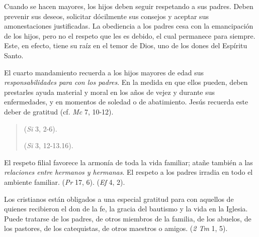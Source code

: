 	Cuando se hacen mayores, los hijos deben seguir respetando a sus padres. Deben prevenir sus deseos, solicitar dócilmente sus consejos y aceptar sus amonestaciones justificadas. La obediencia a los padres cesa con la emancipación de los hijos, pero no el respeto que les es debido, el cual permanece para siempre. Este, en efecto, tiene su raíz en el temor de Dios, uno de los dones del Espíritu Santo.
	
	 El cuarto mandamiento recuerda a los hijos mayores de edad sus \emph{responsabilidades para con los padres}. En la medida en que ellos pueden, deben prestarles ayuda material y moral en los años de vejez y durante sus enfermedades, y en momentos de soledad o de abatimiento. Jesús recuerda este deber de gratitud (cf. \emph{Mc} 7, 10-12).
	
	\begin{quote}
		 (\emph{Si} 3, 2-6).
		
		 (\emph{Si} 3, 12-13.16).
	\end{quote}
	

	
	 El respeto filial favorece la armonía de toda la vida familiar; atañe también a las \emph{relaciones entre hermanos y hermanas}. El respeto a los padres irradia en todo el ambiente familiar.  (\emph{Pr} 17, 6).  (\emph{Ef} 4, 2).
	
	 Los cristianos están obligados a una especial gratitud para con aquellos de quienes recibieron el don de la fe, la gracia del bautismo y la vida en la Iglesia. Puede tratarse de los padres, de otros miembros de la familia, de los abuelos, de los pastores, de los catequistas, de otros maestros o amigos.  (\emph{2 Tm} 1, 5).
	

